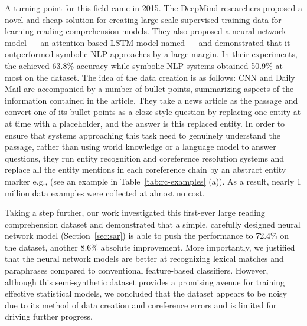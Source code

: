 A turning point for this field came in 2015. The DeepMind researchers  proposed a novel and cheap solution for creating large-scale supervised training data for learning reading comprehension models. They also proposed a neural network model --- an attention-based LSTM model named  --- and demonstrated that it outperformed symbolic NLP approaches by a large margin. In their experiments, the  achieved 63.8\% accuracy while symbolic NLP systems obtained 50.9\% at most on the  dataset.  The idea of the data creation is as follows: CNN and Daily Mail are accompanied by a number of bullet points, summarizing aspects of the information contained in the article. They take a news article as the passage and convert one of its bullet points as a cloze style question by replacing one entity at at time with a placeholder, and the answer is this replaced entity. In order to ensure that systems approaching this task need to genuinely understand the passage, rather than using world knowledge or a language model to answer questions, they run entity recognition and coreference resolution systems and replace all the entity mentions in each coreference chain by an abstract entity marker e.g.,  (see an example in Table~\ref{tab:rc-examples} (a)). As a result, nearly 1 million data examples were collected at almost no cost.

Taking a step further, our work \cite{chen2016thorough} investigated this first-ever large reading comprehension dataset and demonstrated that a simple, carefully designed neural network model (Section~\ref{sec:sar}) is able to push the performance to 72.4\% on the  dataset, another 8.6\% absolute improvement. More importantly, we justified that the neural network models are better at recognizing lexical matches and paraphrases compared to conventional feature-based classifiers. However,  although this semi-synthetic dataset provides a promising avenue for training effective statistical models, we concluded that the dataset appears to be noisy due to its method of data creation and coreference errors and is limited for driving further progress.

